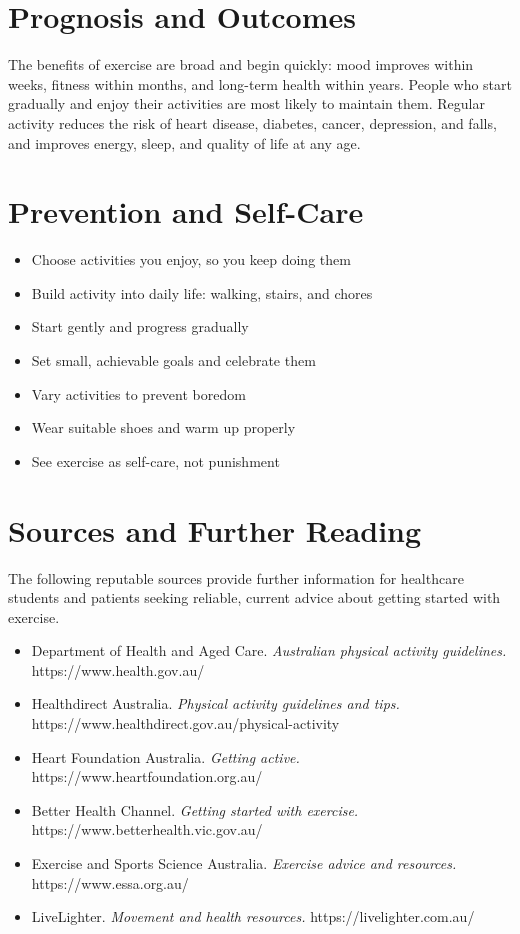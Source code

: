 \section*{Prognosis and Outcomes}
The benefits of exercise are broad and begin quickly: mood improves within weeks, fitness within months, and long-term health within years. People who start gradually and enjoy their activities are most likely to maintain them. Regular activity reduces the risk of heart disease, diabetes, cancer, depression, and falls, and improves energy, sleep, and quality of life at any age.

\section*{Prevention and Self-Care}
\begin{itemize}
    \item Choose activities you enjoy, so you keep doing them
    \item Build activity into daily life: walking, stairs, and chores
    \item Start gently and progress gradually
    \item Set small, achievable goals and celebrate them
    \item Vary activities to prevent boredom
    \item Wear suitable shoes and warm up properly
    \item See exercise as self-care, not punishment
\end{itemize}

\section*{Sources and Further Reading}
The following reputable sources provide further information for healthcare students and patients seeking reliable, current advice about getting started with exercise.
\begin{itemize}
    \item Department of Health and Aged Care. \textit{Australian physical activity guidelines.} https://www.health.gov.au/
    \item Healthdirect Australia. \textit{Physical activity guidelines and tips.} https://www.healthdirect.gov.au/physical-activity
    \item Heart Foundation Australia. \textit{Getting active.} https://www.heartfoundation.org.au/
    \item Better Health Channel. \textit{Getting started with exercise.} https://www.betterhealth.vic.gov.au/
    \item Exercise and Sports Science Australia. \textit{Exercise advice and resources.} https://www.essa.org.au/
    \item LiveLighter. \textit{Movement and health resources.} https://livelighter.com.au/
\end{itemize}

